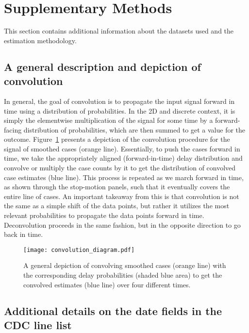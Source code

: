 \section{Supplementary Methods}

This section contains additional information about the datasets used and the estimation methodology.

\subsection{A general description and depiction of convolution}
\label{supp:convol}

In general, the goal of convolution is to propagate the input signal forward in time using a distribution of probabilities. In the 2D and discrete context, it is simply the elementwise multiplication of the signal for some time by a forward-facing distribution of probabilities, which are then summed to get a value for the outcome. Figure~\ref{fig:convol} presents a depiction of the convolution procedure for the signal of smoothed cases (orange line). Essentially, to push the cases forward in time, we take the appropriately aligned (forward-in-time) delay distribution and convolve or multiply the case counts by it to get the distribution of convolved case estimates (blue line). This process is repeated as we march forward in time, as shown through the stop-motion panels, such that it eventually covers the entire line of cases. An important takeaway from this is that convolution is not the same as a simple shift of the data points, but rather it utilizes the most relevant probabilities to propagate the data points forward in time. Deconvolution proceeds in the same fashion, but in the opposite direction to go back in time. 

\begin{figure}[H]
\centering
    \texttt{[image: convolution\_diagram.pdf]}
    \caption{A general depiction of convolving smoothed cases (orange line) with the corresponding delay probabilities (shaded blue area) to get the convolved estimates (blue line) over four different times.}
    \label{fig:convol}
\end{figure}

\subsection{Additional details on the date fields in the CDC line list}
\label{supp:linelist-details}

